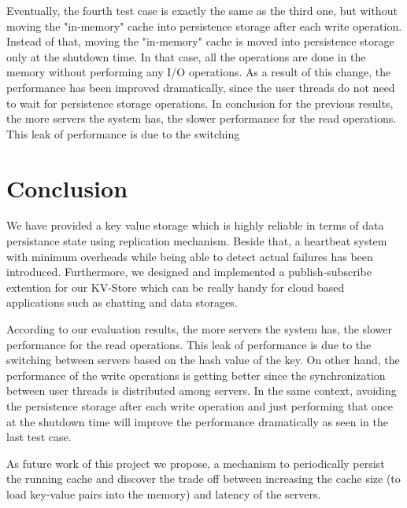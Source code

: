\documentclass{sig-alternate}
\begin{document}
Eventually, the fourth test case is exactly the same as the third one, but without moving the "in-memory" cache into persistence storage after each write operation. Instead of that, moving the "in-memory" cache is moved into persistence storage only at the shutdown time. In that case, all the operations are done in the memory without performing any I/O operations. As a result of this change, the performance has been improved dramatically, since the user threads do not need to wait for persistence storage operations.
In conclusion for the previous results, the more servers the system has, the slower performance for the read operations. This leak of performance is due to the switching 
\section{Conclusion}
We have provided a key value storage which is highly reliable in terms of data persistance state using replication mechanism. Beside that, a heartbeat system with minimum overheads while being able to detect actual failures has been introduced. Furthermore, we designed and implemented a publish-subscribe extention for our KV-Store which can be really handy for cloud based applications such as chatting and data storages.

According to our evaluation results, the more servers the system has, the slower performance for the read operations. This leak of performance is due to the switching between servers based on the hash value of the key. On other hand, the performance of the write operations is getting better since the synchronization between user threads is distributed among servers. In the same context, avoiding the persistence storage after each write operation and just performing that once at the shutdown time will improve the performance dramatically as seen in the last test case.

As future work of this project we propose, a mechanism to periodically persist the running cache and discover the trade off between increasing the cache size (to load key-value pairs into the memory) and latency of the servers. 


%

%
%

\end{document}
